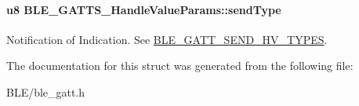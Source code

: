\paragraph[{\texorpdfstring{send\+Type}{sendType}}]{\setlength{\rightskip}{0pt plus 5cm}u8 B\+L\+E\+\_\+\+G\+A\+T\+T\+S\+\_\+\+Handle\+Value\+Params\+::send\+Type}\hypertarget{struct_b_l_e___g_a_t_t_s___handle_value_params_ac6eec504da20e273acb8e10f0482f21f}{}\label{struct_b_l_e___g_a_t_t_s___handle_value_params_ac6eec504da20e273acb8e10f0482f21f}
Notification of Indication. See \hyperlink{group___b_l_e___g_a_t_t___s_e_n_d___h_v___t_y_p_e_s}{B\+L\+E\+\_\+\+G\+A\+T\+T\+\_\+\+S\+E\+N\+D\+\_\+\+H\+V\+\_\+\+T\+Y\+P\+ES}. 

The documentation for this struct was generated from the following file\+:\begin{DoxyCompactItemize}
\item 
B\+L\+E/ble\+\_\+gatt.\+h\end{DoxyCompactItemize}
